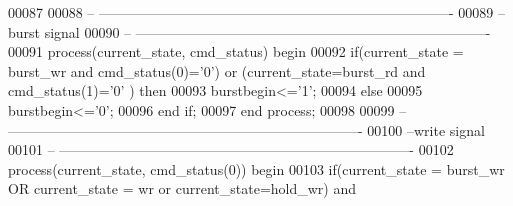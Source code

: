 \begin{DoxyCode}
00087 
00088 \textcolor{keyword}{-- ----------------------------------------------------------------------------}
00089 \textcolor{keyword}{--burst signal}
00090 \textcolor{keyword}{-- ----------------------------------------------------------------------------}
00091 \textcolor{keywordflow}{process}(current_state, cmd_status) \textcolor{keywordflow}{begin}
00092     \textcolor{keywordflow}{if}\textcolor{vhdlchar}{(}\textcolor{vhdlchar}{current_state} \textcolor{vhdlchar}{=} \textcolor{vhdlchar}{burst\_wr} \textcolor{keywordflow}{and} \textcolor{vhdlchar}{cmd_status}\textcolor{vhdlchar}{(}\textcolor{vhdllogic}{}\textcolor{vhdllogic}{0}\textcolor{vhdlchar}{)}\textcolor{vhdlchar}{=}\textcolor{vhdlchar}{'}\textcolor{vhdllogic}{}\textcolor{vhdllogic}{0}\textcolor{vhdlchar}{'}\textcolor{vhdlchar}{)} \textcolor{keywordflow}{or} \textcolor{vhdlchar}{(}\textcolor{vhdlchar}{current_state}\textcolor{vhdlchar}{=}\textcolor{vhdlchar}{burst\_rd} \textcolor{keywordflow}{and} \textcolor{vhdlchar}{
      cmd_status}\textcolor{vhdlchar}{(}\textcolor{vhdllogic}{}\textcolor{vhdllogic}{1}\textcolor{vhdlchar}{)}\textcolor{vhdlchar}{=}\textcolor{vhdlchar}{'}\textcolor{vhdllogic}{}\textcolor{vhdllogic}{0}\textcolor{vhdlchar}{'} \textcolor{vhdlchar}{)} \textcolor{keywordflow}{then}
00093         \textcolor{vhdlchar}{burstbegin}\textcolor{vhdlchar}{<=}\textcolor{vhdlchar}{'}\textcolor{vhdllogic}{}\textcolor{vhdllogic}{1}\textcolor{vhdlchar}{'};
00094     \textcolor{keywordflow}{else}
00095         \textcolor{vhdlchar}{burstbegin}\textcolor{vhdlchar}{<=}\textcolor{vhdlchar}{'}\textcolor{vhdllogic}{}\textcolor{vhdllogic}{0}\textcolor{vhdlchar}{'};
00096     \textcolor{keywordflow}{end} \textcolor{keywordflow}{if};
00097 \textcolor{keywordflow}{end} \textcolor{keywordflow}{process};
00098 
00099 \textcolor{keyword}{-- ----------------------------------------------------------------------------}
00100 \textcolor{keyword}{--write signal}
00101 \textcolor{keyword}{-- ----------------------------------------------------------------------------}
00102 \textcolor{keywordflow}{process}(current_state, cmd_status(\textcolor{vhdllogic}{0})) \textcolor{keywordflow}{begin}
00103     \textcolor{keywordflow}{if}\textcolor{vhdlchar}{(}\textcolor{vhdlchar}{current_state} \textcolor{vhdlchar}{=} \textcolor{vhdlchar}{burst\_wr} \textcolor{keywordflow}{OR} \textcolor{vhdlchar}{current_state} \textcolor{vhdlchar}{=} \textcolor{vhdlchar}{wr} \textcolor{keywordflow}{or} \textcolor{vhdlchar}{current_state}\textcolor{vhdlchar}{=}\textcolor{vhdlchar}{hold\_wr}\textcolor{vhdlchar}{)} \textcolor{keywordflow}{and}  \textcolor{vhdlchar}{
}
\end{DoxyCode}
